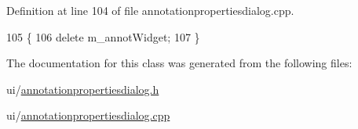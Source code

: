 Definition at line 104 of file annotationpropertiesdialog.\+cpp.


\begin{DoxyCode}
105 \{
106     \textcolor{keyword}{delete} m\_annotWidget;
107 \}
\end{DoxyCode}


The documentation for this class was generated from the following files\+:\begin{DoxyCompactItemize}
\item 
ui/\hyperlink{annotationpropertiesdialog_8h}{annotationpropertiesdialog.\+h}\item 
ui/\hyperlink{annotationpropertiesdialog_8cpp}{annotationpropertiesdialog.\+cpp}\end{DoxyCompactItemize}
